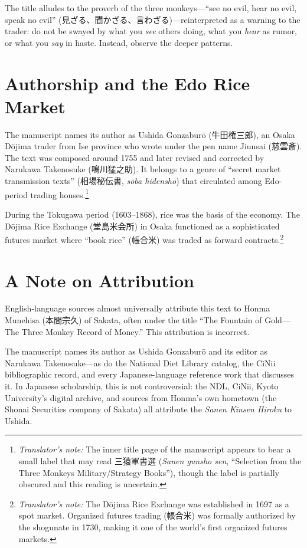 \documentclass[10pt, openany]{book}
\newcommand{\jp}[1]{{\japanesefont #1}}
\newcommand{\tn}[1]{\footnote{\textit{Translator's note:} #1}}
\begin{document}
\begin{sloppypar}
The title alludes to the proverb of the three
monkeys---``see no evil, hear no evil, speak no evil''
(\jp{見ざる、聞かざる、言わざる})---reinterpreted
as a warning to the trader: do not be swayed by what you \textit{see} others
doing, what you \textit{hear} as rumor, or what you \textit{say} in haste.
Instead, observe the deeper patterns.
\end{sloppypar}

\section*{Authorship and the Edo Rice Market}

The manuscript names its author as Ushida Gonzabur\=o (\jp{牛田権三郎}),
an Osaka D\=ojima trader from Ise province who wrote under the pen name
Jiunsai (\jp{慈雲斎}). The text was composed around 1755 and later
revised and corrected by Narukawa Takenosuke (\jp{鳴川猛之助}). It
belongs to a genre of ``secret market transmission texts''
(\jp{相場秘伝書}, \textit{s\=oba hidensho}) that circulated among
Edo-period trading houses.\tn{The inner title page of the manuscript
appears to bear a small label that may read \jp{三猿軍書選}
(\textit{Sanen gunsho sen}, ``Selection from the Three Monkeys
Military/Strategy Books''), though the label is partially obscured and
this reading is uncertain.}

During the Tokugawa period (1603--1868), rice was the basis of the economy.
The D\=ojima Rice Exchange (\jp{堂島米会所}) in Osaka functioned as a
sophisticated futures market where ``book rice'' (\jp{帳合米}) was traded
as forward contracts.\tn{The D\=ojima Rice Exchange was established in 1697
as a spot market. Organized futures trading (\jp{帳合米}) was formally
authorized by the shogunate in 1730, making it one of the world's first
organized futures markets.}

\section*{A Note on Attribution}

English-language sources almost universally attribute this text to Honma
Munehisa (\jp{本間宗久}) of Sakata, often under the title ``The Fountain
of Gold---The Three Monkey Record of Money.'' This attribution is
incorrect.

The manuscript names its author as Ushida Gonzabur\=o and its editor as
Narukawa Takenosuke---as do the National Diet Library catalog, the CiNii
bibliographic record, and every Japanese-language reference work that
discusses it. In Japanese scholarship, this is not controversial:
the NDL, CiNii, Kyoto University's digital archive, and sources from
Honma's own hometown (the Shonai Securities company of Sakata) all
attribute the \textit{Sanen Kinsen Hiroku} to Ushida.
\end{document}
